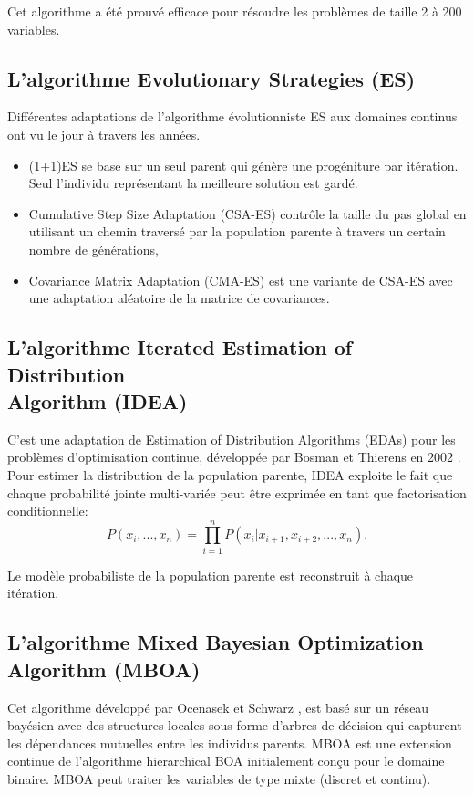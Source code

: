 \vspace{1em}

Cet algorithme a été prouvé efficace pour résoudre les problèmes de taille 2 à 200 variables. 

\subsection{L'algorithme Evolutionary Strategies (ES)}
Différentes adaptations de l'algorithme évolutionniste ES aux domaines continus ont vu le jour à travers les années.
\begin{itemize}
	\item (1+1)ES \cite{kern2004learning} se base sur un seul parent qui génère une progéniture par itération. Seul l'individu représentant la meilleure solution est gardé.
	\item Cumulative Step Size Adaptation (CSA-ES) \cite{hansen2003reducing} contrôle la taille du pas global en utilisant un chemin traversé par la population parente à travers un certain nombre de générations,
	\item Covariance Matrix Adaptation (CMA-ES) \cite{hansen2003reducing} est une variante de CSA-ES avec une adaptation aléatoire de la matrice de covariances.
	
\end{itemize}

\subsection{L'algorithme Iterated Estimation of Distribution \\Algorithm (IDEA)}
C'est une adaptation de Estimation of Distribution Algorithms (EDAs) pour les problèmes d'optimisation continue, développée par Bosman et Thierens en 2002 \cite{bosman2002multi}. Pour estimer la distribution de la population parente, IDEA exploite le fait que chaque probabilité jointe multi-variée peut être exprimée en tant que factorisation conditionnelle:
$$
P(x_i,...,x_n)=\prod_{i=1}^{n}P(x_i|x_{i+1},x_{i+2},...,x_n).
$$

Le modèle probabiliste de la population parente est reconstruit à chaque itération.

\subsection{L'algorithme Mixed Bayesian Optimization Algorithm  (MBOA)}
Cet algorithme développé par Ocenasek et Schwarz \cite{ocenasek2002estimation}, est basé sur un réseau bayésien avec des structures locales sous forme d'arbres de décision qui capturent les dépendances mutuelles entre les individus parents. MBOA est une extension continue de l'algorithme hierarchical BOA initialement conçu pour le domaine binaire. MBOA peut traiter les variables de type mixte (discret et continu).

